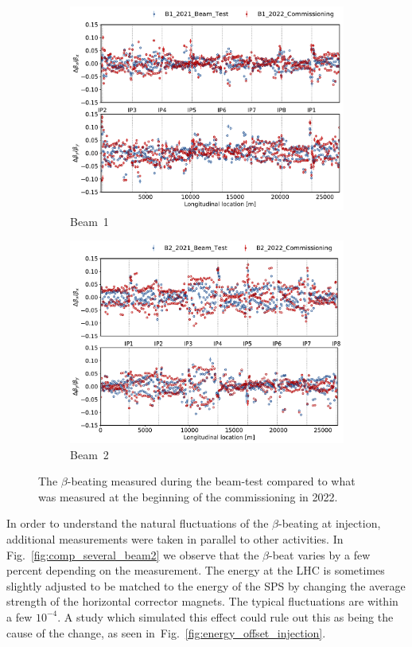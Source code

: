 \documentclass[a4paper]{cernatsnote}
\begin{document}
\begin{figure}[ht]
\begin{subfigure}{.5\textwidth}
  \centering
  \includegraphics[width=.99\linewidth]{plots/beam1/lhcb1_betabeat_vs_beamtest.pdf}  
  \caption{Beam~1}
\end{subfigure}
\begin{subfigure}{.5\textwidth}
  \centering
  \includegraphics[width=.99\linewidth]{plots/beam2/lhcb2_betabeat_vs_beamtest.pdf}  
  \caption{Beam~2}
\end{subfigure}
\caption{The $\beta$-beating measured during the beam-test compared to what was measured at the beginning of the commissioning in 2022.}
\label{fig:2021_beta_beat_vs_2022}
\end{figure}
In order to understand the natural fluctuations of the $\beta$-beating
at injection, additional measurements were taken in parallel to other activities. In Fig.~\ref{fig:comp_several_beam2} we observe that the $\beta$-beat varies by a few percent depending on the measurement. The energy at the LHC is sometimes slightly adjusted to be matched to the energy of the SPS by changing the average strength of the horizontal corrector magnets. The typical fluctuations are within a few $10^{-4}$. A study which simulated this effect could rule out this as being the cause of the change, as seen in~Fig.~\ref{fig:energy_offset_injection}.
\end{document}
